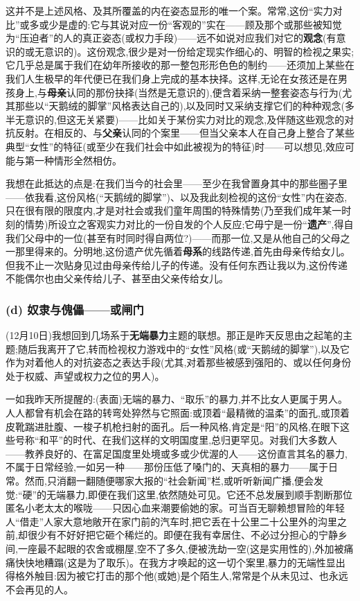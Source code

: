 这并不是上述风格、及其所覆盖的内在姿态显形的\dmark{}唯一个案。常常,这份“实力对比”或多或少是虚的:它与其说对应一份“客观的”实在——顾及那个或那些被知觉为“压迫者”的人的真正姿态(或权力手段)——远不如说对应我们对它的\textbf{观念}(有意识的或无意识的)。这份观念,很少是对一份给定现实作细心的、明智的检视之果实;它几乎总是属于我们在幼年所接收的那一整包形形色色的制约——还须加上某些在我们人生极早的年代便已在我们身上完成的基本抉择。这样,无论在女孩还是在男孩身上,与\textbf{母亲}认同的那份抉择(当然是无意识的),便含着采纳一整套姿态与行为(尤其那些以“天鹅绒的脚掌”风格表达自己的),以及同时又采纳支撑它们的种种观念(多半无意识的,但这无关紧要)——比如关于某份实力对比的观念,及伴随这些观念的对抗反射。在相反的、与\textbf{父亲}认同的个案里——但当父亲本人在自己身上整合了某些典型“女性”的特征(或至少在我们社会中如此被视为的特征)时——可以想见,效应可能与第一种情形全然相仿。

我想在此抵达的点是:在我们当今的社会里——至少在我曾置身其中的那些圈子里——依我看,这份风格(“天鹅绒的脚掌”)、以及我此刻检视的这份“女性”内在姿态,只在很有限的限度内,才是对社会或我们童年周围的特殊情势(乃至我们成年某一时刻的情势)所设立之客观实力对比的一份自发的个人反应;它毋宁是一份“\textbf{遗产}”,得自我们父母中的一位(甚至有时同时得自两位?\dmark{})——而那一位,又是从他自己的父母之一那里得来的。分明地,这份遗产优先循着\textbf{母系}的线路传递,首先由母亲传给女儿。但我不止一次贴身见过由母亲传给儿子的传递。没有任何东西让我以为,这份传递不能偶尔也由父亲传给儿子、甚至由父亲传给女儿。

\subsubsection*{(d) 奴隶与傀儡——或闸门}
\label{ch18:local:h52}

\label{ch18:local:n48}

(12月10日)我想回到几场系于\textbf{无端暴力}主题的联想。那正是昨天反思由之起笔的主题;随后我离开了它,转而检视权力游戏中的“女性”风格(或“天鹅绒的脚掌”),以及它作为对着他人的对抗姿态之表达手段(尤其,对着那些被感到强阳的、或以任何身份处于权威、声望或权力之位的男人)。

一如我昨天所提醒的:(表面)无端的暴力、“取乐”的暴力,并不比女人更属于男人。人人都曾有机会在路的转弯处猝然与它照面:或顶着“最精微的温柔”的面孔,或顶着皮靴踹进肚腹、一梭子机枪扫射的面孔。后一种风格,肯定是“阳”的风格,在眼下这些号称“和平”的时代、在我们这样的文明国度里,总归更罕见。对我们大多数人——教养良好的、在富足国度里处境或多或少优渥的人——这份直言其名的暴力,不属于日常经验,一如另一种——那份压低了嗓门的、天真相的暴力——属于日常。然而,只消翻一翻随便哪家大报的“社会新闻”栏,或听听新闻广播,便会发觉:“硬”的无端暴力,即便在我们这里,依然随处可见。它还不总发展到\dmark{}顺手割断那位匿名小老太太的喉咙——只因心血来潮要偷她的家。可当百无聊赖想冒险的年轻人“借走”人家大意地敞开在家门前的汽车时,把它丢在十公里二十公里外的沟里之前,却很少有不好好把它砸个稀烂的。即便在我有幸居住、不必过分担心的宁静乡间,一座最不起眼的农舍或棚屋,空不了多久,便被洗劫一空(这是实用性的),外加被痛痛快快地糟蹋(这是为了取乐)。在我方才唤起的这一切个案里,暴力的无端性显出得格外触目:因为被它打击的那个他(或她)是个陌生人,常常是个从未见过、也永远不会再见的人。

